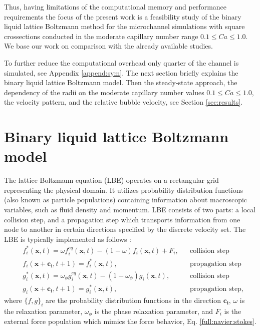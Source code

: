 \documentclass{article}
\begin{document}
Thus, having limitations of the computational memory and performance requirements the focus of the
present work is a feasibility study of the binary liquid lattice Boltzmann method for the
microchannel simulations with square crossections conducted in the moderate capillary number range
$0.1 \leq Ca \leq 1.0$. We base our work on comparison with the already available studies. 

To further reduce the computational overhead only quarter of the channel is simulated, see Appendix
\ref{append:sym}. The next section briefly explains the binary liquid lattice Boltzmann model. Then
the steady-state approach, the dependency of the radii on the moderate capillary number values
$0.1\leq Ca \leq 1.0$, the velocity pattern, and the relative bubble velocity, see Section
\ref{sec:results}. 

\section{Binary liquid lattice Boltzmann model}
The lattice Boltzmann equation (LBE) operates on a rectangular grid representing the
physical domain. It utilizes
probability distribution functions (also known as particle populations)
containing information about
macroscopic variables, such as fluid density and momentum. LBE consists of
two parts: a local collision step, and a propagation step which transports
information from one node to another in certain
directions specified by the discrete velocity set.
The LBE is typically implemented as follows \cite{ginzburg-boundary-main}:
\begin{equation}
\label{standard:implementation}
\begin{aligned}
&f_i^{*}(\bm{x},t)=\omega f_i^{eq}(\bm{x},t)-(1-\omega) f_i(\bm{x},t) +
F_i,&&\text{collision step}\\
&f_i(\bm{x}+\bm{c_i},t+1)=f_i^{*}(\bm{x},t),&&\text{propagation step}\\
&g_i^{*}(\bm{x},t)=\omega_{\phi} g_i^{eq}(\bm{x},t)-(1-\omega_{\phi})
g_i(\bm{x},t),&&\text{collision step}\\
&g_i(\bm{x}+\bm{c_i},t+1)=g_i^{*}(\bm{x},t),&&\text{propagation step},
\end{aligned}
\end{equation}
where $\{f,g\}_i$ are the probability distribution functions in the direction $\bm{c_i}$, $\omega$
is the
relaxation parameter, $\omega_{\phi}$ is the phase relaxation parameter, and $F_i$ is the external
force population which
mimics the force behavior, Eq. \ref{full:navier:stokes}.
\end{document}
